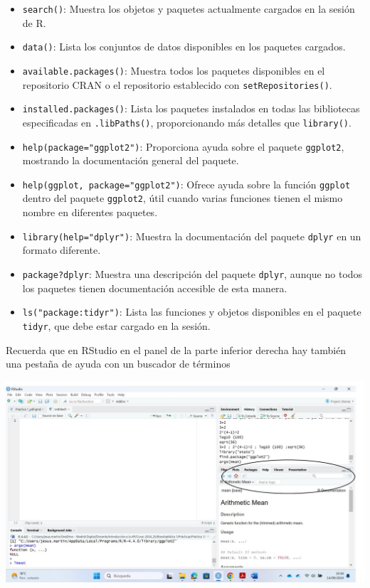 \documentclass[
  letterpaper,
  DIV=11,
  numbers=noendperiod]{scrartcl}
\begin{document}
\begin{itemize}
\item
  \texttt{search()}: Muestra los objetos y paquetes actualmente cargados
  en la sesión de R.
\item
  \texttt{data()}: Lista los conjuntos de datos disponibles en los
  paquetes cargados.
\item
  \texttt{available.packages()}: Muestra todos los paquetes disponibles
  en el repositorio CRAN o el repositorio establecido con
  \texttt{setRepositories()}.
\item
  \texttt{installed.packages()}: Lista los paquetes instalados en todas
  las bibliotecas especificadas en \texttt{.libPaths()}, proporcionando
  más detalles que \texttt{library()}.
\item
  \texttt{help(package="ggplot2")}: Proporciona ayuda sobre el paquete
  \texttt{ggplot2}, mostrando la documentación general del paquete.
\item
  \texttt{help(ggplot,\ package="ggplot2")}: Ofrece ayuda sobre la
  función \texttt{ggplot} dentro del paquete \texttt{ggplot2}, útil
  cuando varias funciones tienen el mismo nombre en diferentes paquetes.
\item
  \texttt{library(help="dplyr")}: Muestra la documentación del paquete
  \texttt{dplyr} en un formato diferente.
\item
  \texttt{package?dplyr}: Muestra una descripción del paquete
  \texttt{dplyr}, aunque no todos los paquetes tienen documentación
  accesible de esta manera.
\item
  \texttt{ls("package:tidyr")}: Lista las funciones y objetos
  disponibles en el paquete \texttt{tidyr}, que debe estar cargado en la
  sesión.
\end{itemize}

Recuerda que en RStudio en el panel de la parte inferior derecha hay
también una pestaña de ayuda con un buscador de términos

\includegraphics{Imagenes/Ayuda RStudio.jpg}
\end{document}

